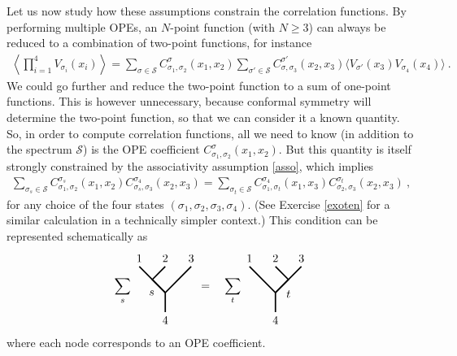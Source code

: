 \documentclass[12pt, a4paper, notitlepage, twoside]{report}
\numberwithin{equation}{section}
\theoremstyle{break}
\begin{document}
Let us now study how these assumptions constrain the correlation functions.
By performing multiple OPEs, an $N$-point function (with $N\geq 3$) can always be reduced to a combination of two-point functions, for instance
\begin{align}
 \left\langle \prod_{i=1}^4 V_{\sigma_i}(x_i) \right\rangle = \sum_{\sigma\in \mathcal{S}} C_{\sigma_1,\sigma_2}^{\sigma}(x_1,x_2)\sum_{\sigma'\in \mathcal{S}} C_{\sigma,\sigma_3}^{\sigma'}(x_2,x_3)\Big\langle V_{\sigma'}(x_3)V_{\sigma_4}(x_4)\Big\rangle\ .
\end{align}
We could go further and reduce the two-point function to a sum of one-point functions.
This is however unnecessary, because conformal symmetry will determine the two-point function, so that we can consider it a known quantity.
So, in order to compute correlation functions, all we need to know (in addition to the spectrum $\mathcal{S}$) is the OPE coefficient $C_{\sigma_1,\sigma_2}^{\sigma}(x_1,x_2)$.
But this quantity is itself strongly constrained by the associativity assumption \eqref{asso}, which implies
\begin{align}
 \sum_{\sigma_s\in \mathcal{S}} C_{\sigma_1,\sigma_2}^{\sigma_s}(x_1,x_2) C_{\sigma_s,\sigma_3}^{\sigma_4}(x_2,x_3) = \sum_{\sigma_t\in \mathcal{S}} C_{\sigma_1,\sigma_t}^{\sigma_4}(x_1,x_3)C_{\sigma_2,\sigma_3}^{\sigma_t}(x_2,x_3)\ ,
\label{cccc}
\end{align}
for any choice of the four states $(\sigma_1,\sigma_2,\sigma_3,\sigma_4)$.
(See Exercise \ref{exoten} for a similar calculation in a technically simpler context.) This condition can be represented schematically as 
\begin{align}
\sum_{s} 
 \begin{tikzpicture}[scale = .2, baseline=(current  bounding  box.center), very thick]
  \draw (-4,3) node [above] {$1$} -- (0, -1) -- (4, 3) node [above] {$3$};
  \draw (0, 3) node [above] {$2$} -- (-2, 1) -- node [below left] {$s$} (0, -1) -- (0, -4) node [below] {$4$};
 \end{tikzpicture}
= \quad
\sum_{t} 
\begin{tikzpicture}[scale = .2, baseline=(current  bounding  box.center), very thick]
  \draw (-4,3) node [above] {$1$} -- (0, -1) -- (4, 3) node [above] {$3$};
  \draw (0, 3) node [above] {$2$} -- (2, 1) -- node [below right] {$t$} (0, -1) -- (0, -4) node [below] {$4$};
  \end{tikzpicture}
\label{sdsd}
\end{align}
where each node corresponds to an OPE coefficient. 
\end{document}
